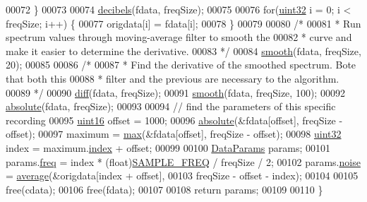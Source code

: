 \begin{DoxyCode}
00072         \}
00073 
00074         \hyperlink{namespacevaso_af9bb2211cf3478333dfc1873bf316263}{decibels}(fdata, freqSize);
00075 
00076         \textcolor{keywordflow}{for}(\hyperlink{definitions_8hpp_a1134b580f8da4de94ca6b1de4d37975e}{uint32} i = 0; i < freqSize; i++) \{
00077             origdata[i] = fdata[i];
00078         \}
00079 
00080         \textcolor{comment}{/*}
00081 \textcolor{comment}{         * Run spectrum values through moving-average filter to smooth the}
00082 \textcolor{comment}{         * curve and make it easier to determine the derivative.}
00083 \textcolor{comment}{         */}
00084         \hyperlink{namespacevaso_a5b7fc1a58199e2cac989f417a9faa1ce}{smooth}(fdata, freqSize, 20);
00085 
00086         \textcolor{comment}{/*}
00087 \textcolor{comment}{         * Find the derivative of the smoothed spectrum. Bote that both this}
00088 \textcolor{comment}{         * filter and the previous are necessary to the algorithm.}
00089 \textcolor{comment}{         */}
00090         \hyperlink{namespacevaso_a7d108bce812e906d8b1810815774c7ea}{diff}(fdata, freqSize);
00091         \hyperlink{namespacevaso_a5b7fc1a58199e2cac989f417a9faa1ce}{smooth}(fdata, freqSize, 100);
00092         \hyperlink{namespacevaso_a6ca90add966ce1773fc59a6883e6cd0c}{absolute}(fdata, freqSize);
00093 
00094         \textcolor{comment}{// find the parameters of this specific recording}
00095         \hyperlink{definitions_8hpp_a05f6b0ae8f6a6e135b0e290c25fe0e4e}{uint16} offset = 1000;
00096         \hyperlink{namespacevaso_a6ca90add966ce1773fc59a6883e6cd0c}{absolute}(&fdata[offset], freqSize - offset);
00097         maximum = \hyperlink{namespacevaso_a122846d728be312454a452d379915e10}{max}(&fdata[offset], freqSize - offset);
00098         \hyperlink{definitions_8hpp_a1134b580f8da4de94ca6b1de4d37975e}{uint32} index = maximum.\hyperlink{structMaximum_a2e6aef03795cd285fe542d0861c6e3b5}{index} + offset;
00099         
00100         \hyperlink{structDataParams}{DataParams} params;
00101         params.\hyperlink{structDataParams_a12566e017407647bc8287d62554ad3fb}{freq} = index * (float)\hyperlink{definitions_8hpp_a8ace559345ecba7978591ac2ef22aea4}{SAMPLE\_FREQ} / freqSize / 2;
00102         params.\hyperlink{structDataParams_a4efd1d2231c6fa7c878c9d5e1650738f}{noise} = \hyperlink{namespacevaso_ad3205136b1cd04b4c6b9d7be73661796}{average}(&origdata[index + offset],
00103                 freqSize - offset - index);
00104 
00105         free(cdata);
00106         free(fdata);
00107 
00108         \textcolor{keywordflow}{return} params;
00109 
00110     \}
\end{DoxyCode}


